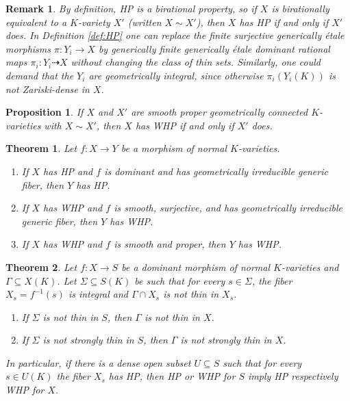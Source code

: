 \documentclass[10pt,a4paper]{amsart}
\newtheorem{remark}{Remark}
\newtheorem{proposition}{Proposition}
\newtheorem{theorem}{Theorem}
\begin{document}
\begin{remark}\label{rem:HP}\label{rem:HP_birat}
By definition, HP is a birational property,
so if $X$ is birationally equivalent to a $K$-variety $X'$ (written $X\sim X'$),
then $X$ has HP if and only if $X'$ does.
In Definition \ref{def:HP} one can replace the finite surjective generically \'etale morphisms $\pi\colon Y_i\rightarrow X$ by generically finite generically \'etale dominant rational maps $\pi_i\colon Y_i\dashrightarrow X$ without changing the class of thin sets.
Similarly, one could demand that the $Y_i$ are geometrically integral, since otherwise $\pi_i(Y_i(K))$ is not Zariski-dense in $X$.
\end{remark}

\begin{proposition}\label{prop:WHP_birat}
If $X$ and $X'$ are smooth proper geometrically connected $K$-varieties with $X\sim X'$,
then $X$ has WHP if and only if $X'$ does.
\end{proposition}

\begin{theorem}\label{thm:down} 
Let $f\colon X\rightarrow Y$ be a morphism of normal $K$-varieties.
\begin{enumerate}
\item If $X$ has HP
and $f$ is dominant
and has geometrically irreducible generic fiber,
then  $Y$ has HP.
\item  If $X$ has WHP and
$f$ is smooth, surjective, and has geometrically irreducible generic fiber,
then  $Y$ has WHP.  
\item If $X$ has WHP 
and $f$ is smooth and proper,
then $Y$ has WHP.
\end{enumerate}
\end{theorem}

\begin{theorem}\label{thm:mixed_fibration}\label{thm:fibration}
Let $f\colon X\rightarrow S$ be a dominant morphism of normal $K$-varieties
and $\Gamma\subseteq X(K)$.
Let $\Sigma\subseteq S(K)$ be such that for every $s\in\Sigma$, the fiber $X_s=f^{-1}(s)$
is  integral and  $\Gamma\cap X_s$ is not thin in $X_s$.
\begin{enumerate}
    \item If $\Sigma$ is not thin in $S$, then $\Gamma$ is not thin in $X$.
    \item If $\Sigma$ is not strongly thin in $S$, then $\Gamma$ is not strongly thin in $X$.
\end{enumerate}
In particular, if there is a dense open subset $U\subseteq S$ such that for every $s\in U(K)$ the fiber $X_s$ has HP,
then HP or WHP for $S$ imply HP respectively WHP for $X$.
\end{theorem}
\end{document}
